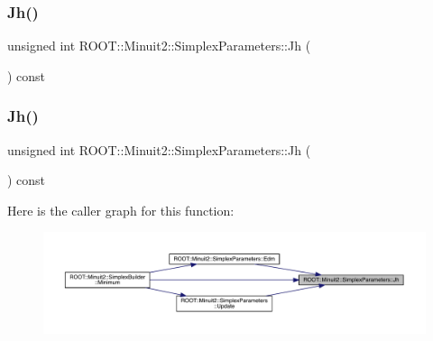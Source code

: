 \subsubsection{\texorpdfstring{Jh()}{Jh()}\hspace{0.1cm}{\footnotesize\ttfamily [2/3]}}
{\footnotesize\ttfamily unsigned int R\+O\+O\+T\+::\+Minuit2\+::\+Simplex\+Parameters\+::\+Jh (\begin{DoxyParamCaption}{ }\end{DoxyParamCaption}) const\hspace{0.3cm}{\ttfamily [inline]}}

\mbox{\label{classROOT_1_1Minuit2_1_1SimplexParameters_a54250c0d286fcf4d6bbb45df037c7d85}} 
\subsubsection{\texorpdfstring{Jh()}{Jh()}\hspace{0.1cm}{\footnotesize\ttfamily [3/3]}}
{\footnotesize\ttfamily unsigned int R\+O\+O\+T\+::\+Minuit2\+::\+Simplex\+Parameters\+::\+Jh (\begin{DoxyParamCaption}{ }\end{DoxyParamCaption}) const\hspace{0.3cm}{\ttfamily [inline]}}

Here is the caller graph for this function\+:
\nopagebreak
\begin{figure}[H]
\begin{center}
\leavevmode
\includegraphics[width=350pt]{d7/da2/classROOT_1_1Minuit2_1_1SimplexParameters_a54250c0d286fcf4d6bbb45df037c7d85_icgraph}
\end{center}
\end{figure}
\mbox{\label{classROOT_1_1Minuit2_1_1SimplexParameters_accfb7ec2b1087661ed3c31dfbb473413}} 
